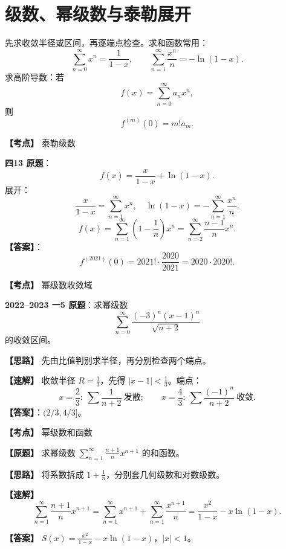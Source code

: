 ﻿\documentclass[11pt,a4paper,UTF8]{ctexart}
\begin{document}
\section{级数、幂级数与泰勒展开}

\begin{templatebox}[幂级数模板]
先求收敛半径或区间，再逐端点检查。求和函数常用：
\[
\sum_{n=0}^\infty x^n=\frac1{1-x},\qquad
\sum_{n=1}^\infty\frac{x^n}{n}=-\ln(1-x).
\]
求高阶导数：若
\[
f(x)=\sum_{n=0}^\infty a_nx^n,
\]
则
\[
f^{(m)}(0)=m!a_m.
\]
\end{templatebox}

\begin{answerbox}[2020--2021 四-13]
\textbf{【考点】} 泰勒级数

\textbf{四13 原题}：
\[
f(x)=\frac{x}{1-x}+\ln(1-x).
\]
展开：
\[
\frac{x}{1-x}=\sum_{n=1}^\infty x^n,
\quad
\ln(1-x)=-\sum_{n=1}^\infty\frac{x^n}{n}.
\]
\[
f(x)=\sum_{n=1}^\infty\left(1-\frac1n\right)x^n
=\sum_{n=2}^\infty\frac{n-1}{n}x^n.
\]
\textbf{【答案】}：
\[
f^{(2021)}(0)=2021!\cdot\frac{2020}{2021}=2020\cdot2020!.
\]

\end{answerbox}

\begin{answerbox}[2022--2023 一-5]
\textbf{【考点】} 幂级数收敛域

\textbf{2022--2023 一5 原题}：求幂级数
\[
\sum_{n=0}^{\infty}\frac{(-3)^n(x-1)^n}{\sqrt{n+2}}
\]
的收敛区间。

\textbf{【思路】} 先由比值判别求半径，再分别检查两个端点。

\textbf{【速解】} 收敛半径 $R=\frac13$，先得 $|x-1|<\frac13$。端点：
\[
x=\frac23:\ \sum\frac1{n+2}\ \text{发散};
\qquad
x=\frac43:\ \sum\frac{(-1)^n}{n+2}\ \text{收敛}.
\]
\textbf{【答案】}：$(2/3,4/3]$。

\end{answerbox}

\newpage

\begin{answerbox}[2024--2025 四]
\textbf{【考点】} 幂级数和函数

\textbf{【原题】} 求幂级数 $\displaystyle \sum_{n=1}^{\infty}\frac{n+1}{n}x^{n+1}$ 的和函数。

\textbf{【思路】} 将系数拆成 $1+\frac1n$，分别套几何级数和对数级数。

\textbf{【速解】}
\[
\sum_{n=1}^{\infty}\frac{n+1}{n}x^{n+1}
=\sum_{n=1}^{\infty}x^{n+1}+\sum_{n=1}^{\infty}\frac{x^{n+1}}{n}
=\frac{x^2}{1-x}-x\ln(1-x).
\]

\textbf{【答案】} $\displaystyle S(x)=\frac{x^2}{1-x}-x\ln(1-x)$，$|x|<1$。
\end{answerbox}
\end{document}
